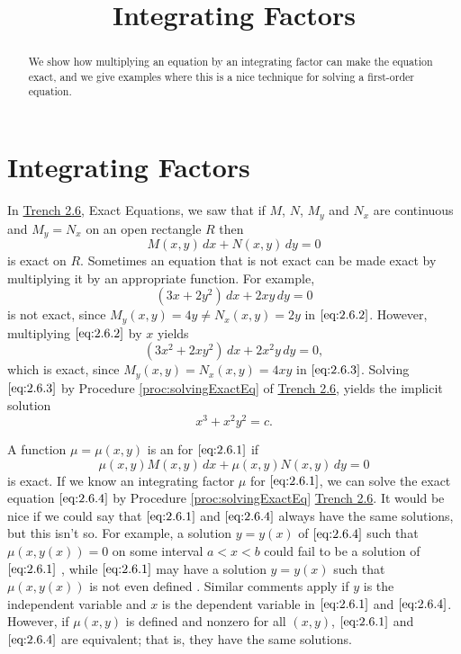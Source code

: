 \documentclass{ximera}
\title{Integrating Factors}
\begin{document}
\begin{abstract}
We show how multiplying an equation by an integrating factor can make the equation exact, and we give examples where this is a nice technique for solving a first-order equation.
\end{abstract}

\maketitle



\section*{Integrating Factors}
In \href{https://xerxes.ximera.org/differentialequations/main/exactEquations/exactEquations}{Trench 2.6}, Exact Equations, we saw that if $M$, $N$, $M_y$ and $N_x$ are
continuous and $M_y=N_x$ on an open rectangle $R$ then
\begin{equation} \label{eq:2.6.1}
M(x,y)\,dx+N(x,y)\,dy=0
\end{equation}
is exact on $R$. Sometimes an equation that is not exact can be made exact by multiplying it by an appropriate function. For example,
\begin{equation}\label{eq:2.6.2}
(3x+2y^2)\,dx+2xy\,dy=0
\end{equation}
is  not exact, since
$M_y(x,y)=4y\neq  N_x(x,y)=2y$ in $\eqref{eq:2.6.2}$.
 However, multiplying $\eqref{eq:2.6.2}$  by $x$ yields
\begin{equation}\label{eq:2.6.3}
(3x^2+2xy^2)\,dx+2x^2y\,dy=0,
\end{equation}
which is exact, since
$M_y(x,y)=N_x(x,y)=4xy$ in $\eqref{eq:2.6.3}$.
Solving $\eqref{eq:2.6.3}$ by Procedure \ref{proc:solvingExactEq} of \href{https://xerxes.ximera.org/differentialequations/main/exactEquations/exactEquations}{Trench 2.6},
 yields the implicit solution
$$
x^3+x^2y^2=c.
$$

A function $\mu=\mu(x,y)$ is  an  for
$\eqref{eq:2.6.1}$  if
\begin{equation}\label{eq:2.6.4}
 \mu(x,y)M (x,y)\,dx+\mu(x,y)N (x,y)\,dy=0
 \end{equation}
 is exact. If we know an integrating
factor $\mu$ for $\eqref{eq:2.6.1}$, we can solve the exact equation
$\eqref{eq:2.6.4}$ by Procedure \ref{proc:solvingExactEq} \href{https://xerxes.ximera.org/differentialequations/main/exactEquations/exactEquations}{Trench 2.6}. It would be
nice if we could say that $\eqref{eq:2.6.1}$ and $\eqref{eq:2.6.4}$ always have the
same solutions, but this isn't so. For example, a solution
$y=y(x)$ of $\eqref{eq:2.6.4}$ such that $\mu(x,y(x))=0$ on some interval
$a<x<b$ could fail to be a solution of $\eqref{eq:2.6.1}$
, while
$\eqref{eq:2.6.1}$ may have a solution $y=y(x)$ such that $\mu(x,y(x))$
is not even defined 
. Similar comments
apply if $y$ is the independent variable and $x$ is the dependent
variable in $\eqref{eq:2.6.1}$ and $\eqref{eq:2.6.4}$.  However, if $\mu(x,y)$
is defined and nonzero for all $(x,y)$, $\eqref{eq:2.6.1}$ and
$\eqref{eq:2.6.4}$ are equivalent; that is, they have the same solutions.
\end{document}
